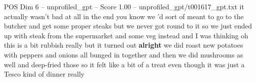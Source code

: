\begin{textsample}{POS Dim 6 – unprofiled\_gpt – Score 1.00 – unprofiled\_gpt/t001617\_gpt.txt}  \label{ex:f6_pos_029}
it actually wasn't bad at all in the end you know we ’d sort of meant to go to the butcher and get some proper steaks but we never got round to it so we just ended up with steak from the supermarket and some veg instead and I was thinking oh this is a bit rubbish really but it turned out \textbf{alright} we did roast new potatoes with peppers and onions all bunged in together and then we did mushrooms as well and deep-fried those so it felt like a bit of a treat even though it was just a Tesco kind of dinner really

\end{textsample}
